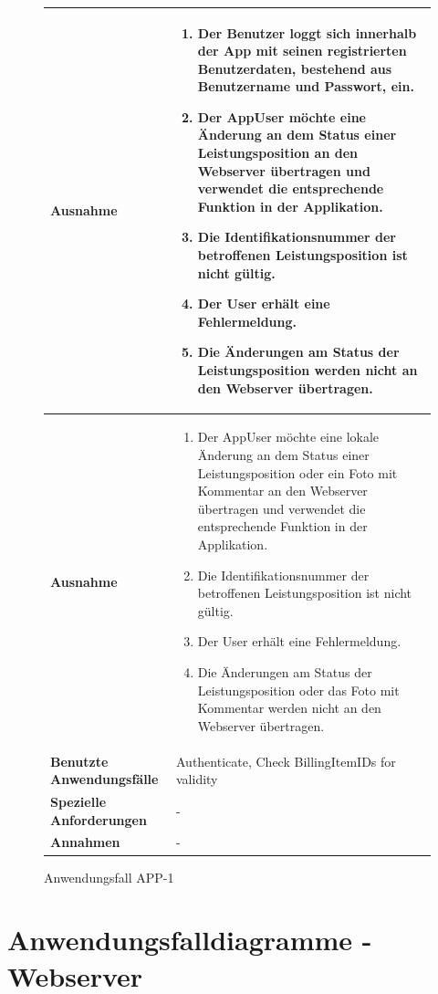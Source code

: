 			\begin{figure}[h]
	\centering
	\begin{tabularx}{\textwidth}{ X | X }
		\textbf{Ausnahme} &
				\begin{enumerate}
				\item Der Benutzer loggt sich innerhalb der App mit seinen registrierten Benutzerdaten, bestehend aus Benutzername und Passwort,  ein.  
					 \item Der AppUser m\"ochte eine \"Anderung an dem Status einer Leistungsposition an den Webserver \"ubertragen und verwendet die entsprechende Funktion in der Applikation. 
					 \item Die Identifikationsnummer der betroffenen Leistungsposition ist nicht g\"ultig.
					 \item Der User erh\"alt eine Fehlermeldung.
					 \item Die \"Anderungen am Status der Leistungsposition werden nicht an den Webserver \"ubertragen.
				\end{enumerate} \\ \hline
						\textbf{Ausnahme} &
				\begin{enumerate}
					 \item Der AppUser m\"ochte eine lokale \"Anderung an dem Status einer Leistungsposition oder ein Foto mit Kommentar an den Webserver \"ubertragen und verwendet die entsprechende Funktion in der Applikation. 
					 \item Die Identifikationsnummer der betroffenen Leistungsposition ist nicht g\"ultig.
					 \item Der User erh\"alt eine Fehlermeldung.
					 \item Die \"Anderungen am Status der Leistungsposition oder das Foto mit Kommentar werden nicht an den Webserver \"ubertragen.
				\end{enumerate} \\ \hline
		\textbf{Benutzte Anwendungsfälle} & Authenticate,  Check BillingItemIDs for validity\\ \hline
		\textbf{Spezielle Anforderungen} & - \\ \hline
		\textbf{Annahmen} & -
	\end{tabularx}
	\caption{Anwendungsfall APP-1}
	\label{fig:anwendungsfall-app-tabelle-APP-1-4}
\end{figure}

\clearpage

\section{Anwendungsfalldiagramme - Webserver}

